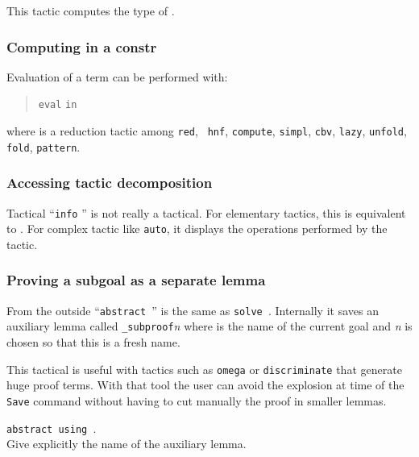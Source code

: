 This tactic computes the type of {\term}.

\subsubsection{Computing in a constr}

Evaluation of a term can be performed with:
\begin{quote}
{\tt eval} {} {\tt in} {\term}
\end{quote}
where  is a reduction tactic among {\tt red}, {\tt
hnf}, {\tt compute}, {\tt simpl}, {\tt cbv}, {\tt lazy}, {\tt unfold},
{\tt fold}, {\tt pattern}.


\subsubsection{Accessing tactic decomposition}

Tactical ``{\tt info} {\tacexpr}'' is not really a tactical. For
elementary tactics, this is equivalent to \tacexpr. For complex tactic
like \texttt{auto}, it displays the operations performed by the
tactic.

\subsubsection{Proving a subgoal as a separate lemma}

From the outside ``\texttt{abstract \tacexpr}'' is the same as
{\tt solve \tacexpr}. Internally it saves an auxiliary lemma called 
{\ident}\texttt{\_subproof}\textit{n} where {\ident} is the name of the
current goal and \textit{n} is chosen so that this is a fresh name.

This tactical is useful with tactics such as \texttt{omega} or
\texttt{discriminate} that generate huge proof terms. With that tool
the user can avoid the explosion at time of the \texttt{Save} command
without having to cut manually the proof in smaller lemmas.

\begin{Variants}
\item \texttt{abstract {\tacexpr} using {\ident}}.\\
  Give explicitly the name of the auxiliary lemma.
\end{Variants}

\ErrMsg {}

